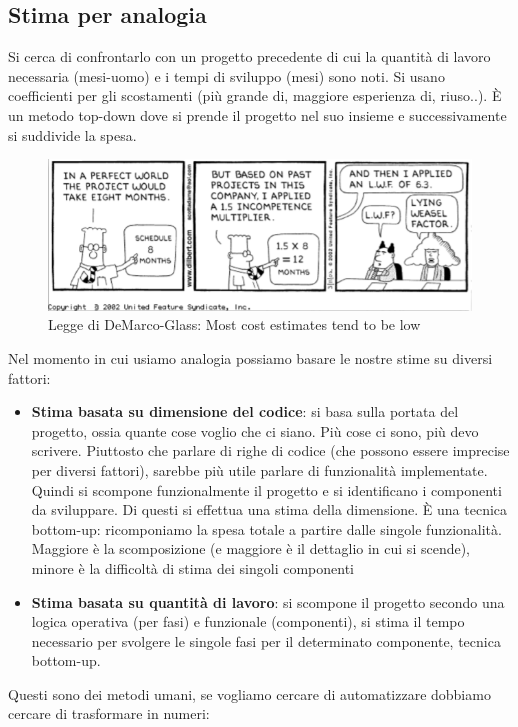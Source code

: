 \subsection{Stima per analogia}
Si cerca di confrontarlo con un progetto precedente di cui la quantità di lavoro necessaria (mesi-uomo) e i tempi di sviluppo (mesi) sono noti.
Si usano coefficienti per gli scostamenti (più grande di, maggiore esperienza di, riuso..). È un metodo top-down dove si prende il progetto nel suo insieme e successivamente si suddivide la spesa.

\begin{figure}[H]
	\centering
	 \includegraphics[width=\linewidth]{img/stimecosti.png}
	 \caption{Legge di DeMarco-Glass: Most cost estimates tend to be low}
\end{figure}
\noindent Nel momento in cui usiamo analogia possiamo basare le nostre stime su diversi fattori:
\begin{itemize}
    \item \textbf{Stima basata su dimensione del codice}: si basa sulla portata del progetto, ossia quante cose voglio che ci siano. Più cose ci sono, più devo scrivere. Piuttosto che parlare di righe di codice (che possono essere imprecise per diversi fattori), sarebbe più utile parlare di funzionalità implementate. Quindi si scompone funzionalmente il progetto e si identificano i componenti da sviluppare. Di questi si effettua una stima della dimensione. È una tecnica bottom-up: ricomponiamo la spesa totale a partire dalle singole funzionalità. Maggiore è la scomposizione (e maggiore è il dettaglio in cui si scende), minore è la difficoltà di stima dei singoli componenti
    \item \textbf{Stima basata su quantità di lavoro}: si scompone il progetto secondo una logica operativa (per fasi) e funzionale (componenti), si stima il tempo necessario per svolgere le singole fasi per il determinato componente, tecnica bottom-up.
\end{itemize}
Questi sono dei metodi umani, se vogliamo cercare di automatizzare dobbiamo cercare di trasformare in numeri:
